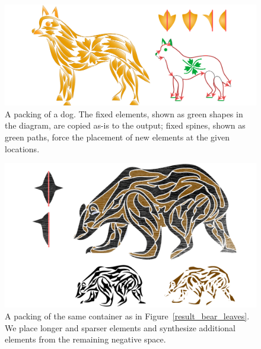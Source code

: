 \begin{figure}
\centering
\includegraphics[width=1.0\textwidth]{figures/flowpak/dog_flower.pdf}
\caption[A packing of a dog]
{A packing of a dog. The fixed elements, shown as green
  shapes in the diagram, are copied as-is to the output; fixed spines,
  shown as green paths, force the placement of new elements at the given
  locations.}
\label{result_dog}
\end{figure}

\begin{figure}
\centering
\includegraphics[width=1.0\textwidth]{figures/flowpak/bear_offset_space.pdf}
\caption[A packing of a bear with a few elements created from negative space]
{A packing of the same container as in Figure~\ref{result_bear_leaves}.
  We place longer and sparser elements and synthesize additional elements 
  from the remaining negative space.
  }
\label{result_bear_offset}
\end{figure}

